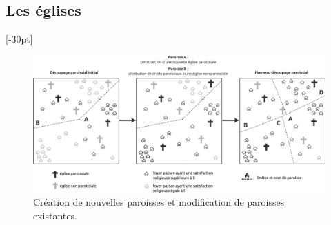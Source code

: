 {\subsection{Les églises}[-30pt]

\begin{figure}[!h]
	\centering
	\includegraphics[width=1\linewidth]{src/Chapitre_TMD/Fig5}
	\caption{Création de nouvelles paroisses et modification de paroisses existantes.}
	\label{fig:fig5}
\end{figure}

}

